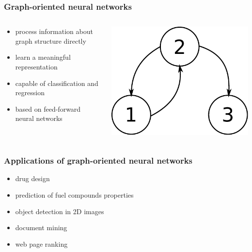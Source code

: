 \documentclass{beamer}
\begin{document}
\begin{frame}
\frametitle{Graph-oriented neural networks}
\begin{columns}
	\begin{column}{0.66\textwidth}
		\begin{itemize}
			\item process information about graph structure directly
			\item learn a meaningful representation
			\item capable of classification and regression
			\item based on feed-forward neural networks
		\end{itemize}
	\end{column}
	\begin{column}{0.34\textwidth}
		\includegraphics[scale=0.4]{img/graph}
	\end{column}
\end{columns}
\end{frame}

\begin{frame}
\frametitle{Applications of graph-oriented neural networks}
\begin{itemize}
	\item drug design
	\item prediction of fuel compounds properties
	\item object detection in 2D images
	\item document mining
	\item web page ranking
\end{itemize}
\end{frame}
\end{document}
